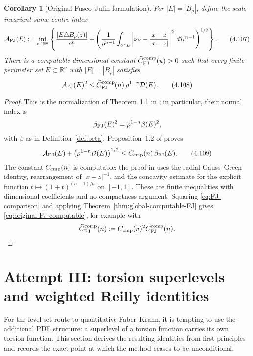 \documentclass[11pt]{amsart}
\newtheorem{corollary}[theorem]{Corollary}
\theoremstyle{definition}
\newcommand{\R}{\mathbb R}
\newcommand{\Hn}{\mathcal H^{n-1}}
\newcommand{\Def}{\mathcal D}
\begin{document}
\begin{corollary}[Original Fusco--Julin formulation]
\label{cor:original-FJ-computable}
For \(|E|=|B_\rho|\), define the scale-invariant same-centre index
\[
   \mathcal A_{\rm FJ}(E)
   :=
   \inf_{z\in\R^n}
   \left\{
      \frac{|E\triangle B_\rho(z)|}{\rho^n}
      +
      \left(
         \frac1{\rho^{n-1}}
         \int_{\partial^*E}
         \left|\nu_E-\frac{x-z}{|x-z|}\right|^2\,d\Hn
      \right)^{1/2}
   \right\}.
\tag{4.107}\label{eq:A-FJ-combined}
\]
There is a computable dimensional constant
\(\widehat C_{\rm FJ}^{\rm comp}(n)>0\) such that every
finite-perimeter set \(E\subset\R^n\) with \(|E|=|B_\rho|\) satisfies
\[
   \mathcal A_{\rm FJ}(E)^2
      \le \widehat C_{\rm FJ}^{\rm comp}(n)\,
          \rho^{1-n}\Def(E).
\tag{4.108}\label{eq:original-FJ-computable}
\]
\end{corollary}

\begin{proof}
This is the normalization of Theorem~1.1 in \cite{FJ}; in particular,
their normal index is
\[
   \beta_{\rm FJ}(E)^2=\rho^{1-n}\beta(E)^2,
\]
with \(\beta\) as in Definition~\ref{def:beta}.  Proposition~1.2 of
\cite{FJ} proves
\[
   \mathcal A_{\rm FJ}(E)
      +\bigl(\rho^{1-n}\Def(E)\bigr)^{1/2}
      \le C_{\rm cmp}(n)\,\beta_{\rm FJ}(E).
\tag{4.109}\label{eq:FJ-comparison}
\]
The constant \(C_{\rm cmp}(n)\) is computable: the proof in \cite{FJ}
uses the radial Gauss--Green identity, rearrangement of
\(|x-z|^{-1}\), and the concavity estimate for the explicit function
\(t\mapsto(1+t)^{(n-1)/n}\) on \([-1,1]\).  These are finite
inequalities with dimensional coefficients and no compactness argument.
Squaring \eqref{eq:FJ-comparison} and applying
Theorem~\ref{thm:global-computable-FJ} gives
\eqref{eq:original-FJ-computable}, for example with
\[
   \widehat C_{\rm FJ}^{\rm comp}(n)
       := C_{\rm cmp}(n)^2 C_{\rm FJ}^{\rm comp}(n).
\]
\end{proof}

\section{Attempt III: torsion superlevels and weighted Reilly identities}
\label{sec:reilly}

For the level-set route to quantitative Faber--Krahn, it is tempting to use
the additional PDE structure: a superlevel of a torsion function carries its
own torsion function.  This section derives the resulting identities from
first principles and records the exact point at which the method ceases to be
unconditional.
\end{document}
